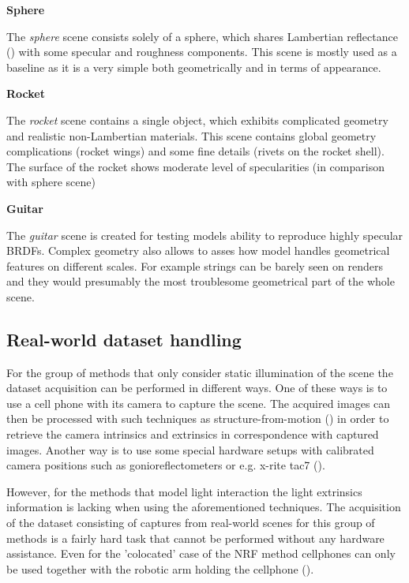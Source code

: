 \textbf{Sphere}

The \textit{sphere} scene consists solely of a sphere,
which shares Lambertian reflectance (\cite{blinn1982light}) with some specular and roughness components.
This scene is mostly used as a baseline as it is a very simple
both geometrically and in terms of appearance.

\textbf{Rocket}

The \textit{rocket} scene contains a single object,
which exhibits complicated geometry and realistic non-Lambertian materials.
This scene contains global geometry complications (rocket wings) and some fine details (rivets on the rocket shell).
The surface of the rocket shows moderate level of specularities (in comparison with sphere scene)

\textbf{Guitar}

The \textit{guitar} scene is created for testing models ability
to reproduce highly specular BRDFs.
Complex geometry also allows to asses how model handles geometrical features on different scales.
For example strings can be barely seen on renders and they would presumably the most troublesome geometrical part of the whole scene.



\subsection{Real-world dataset handling}

For the group of methods that only consider static illumination of the scene
the dataset acquisition can be performed in different ways.
One of these ways is to use a cell phone with its camera to capture the scene.
The acquired images can then be processed with such techniques as
structure-from-motion (\cite{Moulon2012, Jancosek2011, schoenberger2016structure})
in order to retrieve the camera intrinsics and extrinsics in correspondence with captured images.
Another way is to use some special hardware setups with calibrated camera positions
such as gonioreflectometers or e.g. x-rite tac7 (\cite{merzbach2017highquality}).

However, for the methods that model light interaction the light extrinsics information is lacking
when using the aforementioned techniques.
The acquisition of the dataset consisting of captures from real-world scenes
for this group of methods is a fairly hard task that cannot be performed without any hardware assistance.
Even for the 'colocated' case of the NRF method cellphones can only be used
together with the robotic arm holding the cellphone (\cite{bi2020neural}).

